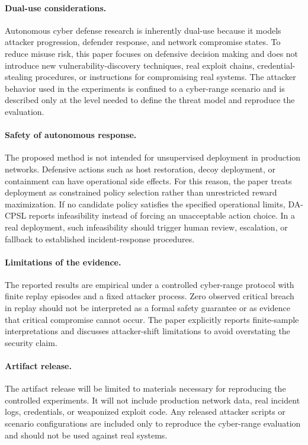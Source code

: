 \documentclass[sigconf,review,anonymous]{acmart}
\begin{document}
\paragraph{Dual-use considerations.}
Autonomous cyber defense research is inherently dual-use because it
models attacker progression, defender response, and network compromise
states. To reduce misuse risk, this paper focuses on defensive decision
making and does not introduce new vulnerability-discovery techniques,
real exploit chains, credential-stealing procedures, or instructions for
compromising real systems. The attacker behavior used in the experiments
is confined to a cyber-range scenario and is described only at the level
needed to define the threat model and reproduce the evaluation.

\paragraph{Safety of autonomous response.}
The proposed method is not intended for unsupervised deployment in
production networks. Defensive actions such as host restoration, decoy
deployment, or containment can have operational side effects. For this
reason, the paper treats deployment as constrained policy selection
rather than unrestricted reward maximization. If no candidate policy
satisfies the specified operational limits, DA-CPSL reports infeasibility
instead of forcing an unacceptable action choice. In a real deployment,
such infeasibility should trigger human review, escalation, or fallback
to established incident-response procedures.

\paragraph{Limitations of the evidence.}
The reported results are empirical under a controlled cyber-range
protocol with finite replay episodes and a fixed attacker process. Zero
observed critical breach in replay should not be interpreted as a formal
safety guarantee or as evidence that critical compromise cannot occur.
The paper explicitly reports finite-sample interpretations and discusses
attacker-shift limitations to avoid overstating the security claim.

\paragraph{Artifact release.}
The artifact release will be limited to materials necessary for
reproducing the controlled experiments. It will not include production
network data, real incident logs, credentials, or weaponized exploit
code. Any released attacker scripts or scenario configurations are
included only to reproduce the cyber-range evaluation and should not be
used against real systems.
\end{document}
